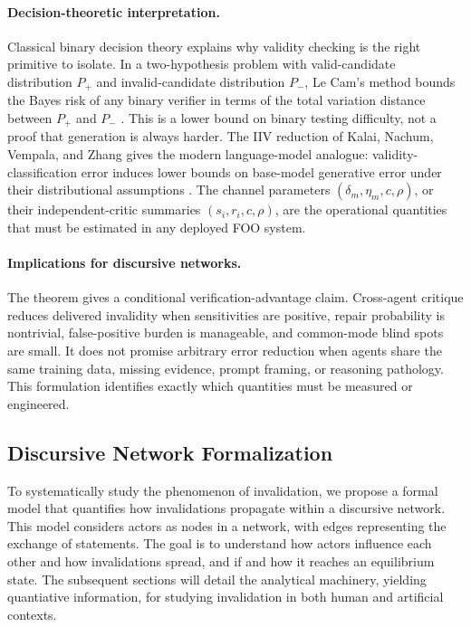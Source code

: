 \documentclass[12pt]{article}
\theoremstyle{definition}
\begin{document}
\paragraph{Decision-theoretic interpretation.}
Classical binary decision theory explains why validity checking is the right
primitive to isolate.  In a two-hypothesis problem with valid-candidate
distribution $P_+$ and invalid-candidate distribution $P_-$, Le Cam's method
bounds the Bayes risk of any binary verifier in terms of the total variation
distance between $P_+$ and $P_-$ \parencite{lecam1973,tsybakov2009}.  This is a
lower bound on binary testing difficulty, not a proof that generation is always
harder.  The IIV reduction of Kalai, Nachum, Vempala, and Zhang gives the modern
language-model analogue: validity-classification error induces lower bounds on
base-model generative error under their distributional assumptions
\parencite{kalai2025why}.  The channel parameters $(\delta_m,\eta_m,c,\rho)$,
or their independent-critic summaries $(s_i,r_i,c,\rho)$, are the operational
quantities that must be estimated in any deployed FOO system.

\paragraph{Implications for discursive networks.}
The theorem gives a conditional verification-advantage claim.  Cross-agent
critique reduces delivered invalidity when sensitivities are positive, repair
probability is nontrivial, false-positive burden is manageable, and common-mode
blind spots are small.  It does not promise arbitrary error reduction when
agents share the same training data, missing evidence, prompt framing, or
reasoning pathology.  This formulation identifies exactly which quantities must
be measured or engineered.


\subsection{Discursive Network Formalization}\label{sec:discursive}
To systematically study the phenomenon of invalidation, we propose a formal model that quantifies how invalidations propagate within a discursive network. This model considers actors as nodes in a network, with edges representing the exchange of statements. The goal is to understand how actors influence each other and how invalidations spread, and if and how it reaches an equilibrium state. The subsequent sections will detail the analytical machinery, yielding quantiative information, for studying invalidation in both human and artificial contexts.
\end{document}
